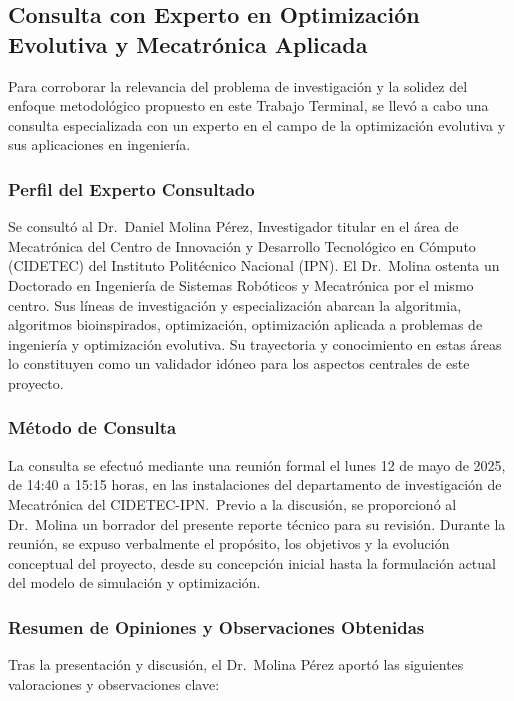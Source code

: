 \subsection[Consulta con experto núm. 02]{Consulta con Experto en Optimización Evolutiva y Mecatrónica Aplicada}

Para corroborar la relevancia del problema de investigación y la solidez del enfoque metodológico propuesto en este Trabajo Terminal, se llevó a cabo una consulta especializada con un experto en el campo de la optimización evolutiva y sus aplicaciones en ingeniería.

\subsubsection{Perfil del Experto Consultado}

Se consultó al Dr.\ Daniel Molina Pérez, Investigador titular en el área de Mecatrónica del Centro de Innovación y Desarrollo Tecnológico en Cómputo (CIDETEC) del Instituto Politécnico Nacional (IPN). El Dr.\ Molina ostenta un Doctorado en Ingeniería de Sistemas Robóticos y Mecatrónica por el mismo centro. Sus líneas de investigación y especialización abarcan la algoritmia, algoritmos bioinspirados, optimización, optimización aplicada a problemas de ingeniería y optimización evolutiva. Su trayectoria y conocimiento en estas áreas lo constituyen como un validador idóneo para los aspectos centrales de este proyecto.

\subsubsection{Método de Consulta}

La consulta se efectuó mediante una reunión formal el lunes 12 de mayo de 2025, de 14:40 a 15:15 horas, en las instalaciones del departamento de investigación de Mecatrónica del CIDETEC-IPN.\ Previo a la discusión, se proporcionó al Dr.\ Molina un borrador del presente reporte técnico para su revisión. Durante la reunión, se expuso verbalmente el propósito, los objetivos y la evolución conceptual del proyecto, desde su concepción inicial hasta la formulación actual del modelo de simulación y optimización.

\subsubsection{Resumen de Opiniones y Observaciones Obtenidas}

Tras la presentación y discusión, el Dr.\ Molina Pérez aportó las siguientes valoraciones y observaciones clave:

